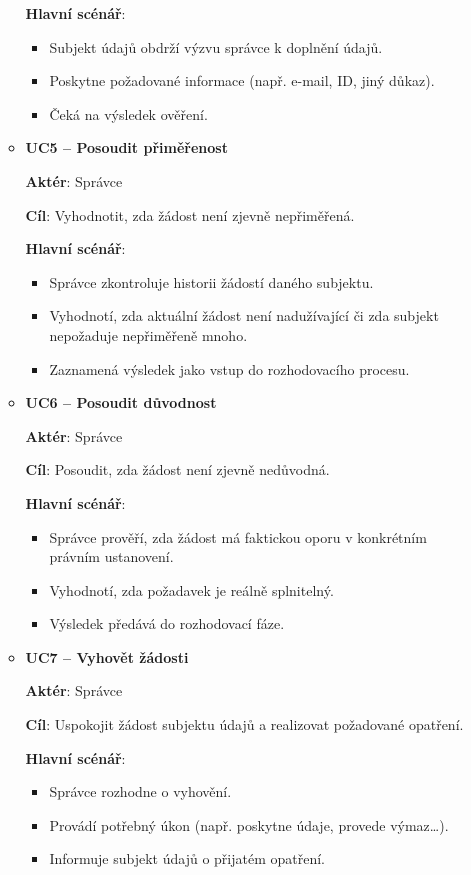 \begin{itemize}
\begin{itemize}
    \textbf{Hlavní scénář}: 
    \begin{itemize}
        \item Subjekt údajů obdrží výzvu správce k doplnění údajů.
        \item Poskytne požadované informace (např. e-mail, ID, jiný důkaz).
        \item Čeká na výsledek ověření.
    \end{itemize}

    \item \textbf{UC5 – Posoudit přiměřenost}

    \textbf{Aktér}: Správce

    \textbf{Cíl}: Vyhodnotit, zda žádost není zjevně nepřiměřená.

    \textbf{Hlavní scénář}: 
    \begin{itemize}
        \item Správce zkontroluje historii žádostí daného subjektu.
        \item Vyhodnotí, zda aktuální žádost není nadužívající či zda subjekt nepožaduje nepřiměřeně mnoho.
        \item Zaznamená výsledek jako vstup do rozhodovacího procesu.
    \end{itemize}

    \item \textbf{UC6 – Posoudit důvodnost}

    \textbf{Aktér}: Správce

    \textbf{Cíl}: Posoudit, zda žádost není zjevně nedůvodná.

    \textbf{Hlavní scénář}: 
    \begin{itemize}
        \item Správce prověří, zda žádost má faktickou oporu v konkrétním právním ustanovení.
        \item Vyhodnotí, zda požadavek je reálně splnitelný.
        \item Výsledek předává do rozhodovací fáze.
    \end{itemize}

    \item \textbf{UC7 – Vyhovět žádosti}

    \textbf{Aktér}: Správce

    \textbf{Cíl}: Uspokojit žádost subjektu údajů a realizovat požadované opatření.

    \textbf{Hlavní scénář}: 
    \begin{itemize}
        \item Správce rozhodne o vyhovění.
        \item Provádí potřebný úkon (např. poskytne údaje, provede výmaz…).
        \item Informuje subjekt údajů o přijatém opatření.
    \end{itemize}


\end{itemize}
\end{itemize}
